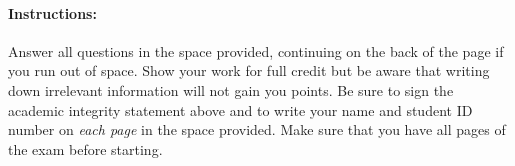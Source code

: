 \documentclass[addpoints,12pt]{exam}
\begin{document}
\begin{center}
\large
{} %

\vspace{1em}
\vspace{0.2in}
\normalsize
{}


\end{center}


\vspace{2em}
\begin{center}
\end{center}
\vspace{0.2in}

\vspace{0.2in}
\noindent {}

\vspace{0.3in}
\noindent{}



\vspace{2em}

\paragraph{Instructions:} Answer all questions in the space provided, continuing on the back of the page if you run out of space. Show your work for full credit but be aware that writing down irrelevant information will not gain you points. Be sure to sign the academic integrity statement above and to write your name and student ID number on \emph{each page} in the space provided. Make sure that you have all pages of the exam before starting.
\end{document}
